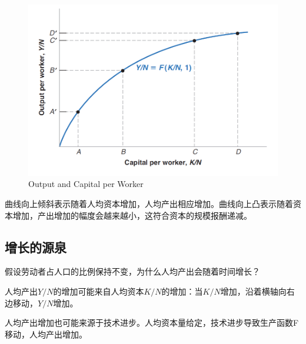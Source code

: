\documentclass{article}
\begin{document}
\begin{figure}[H] %
	\centering %
	\includegraphics[width=1\textwidth]{10_1} %
	\caption{Output and Capital per
		Worker} %
	\label{Fig.main2} %
\end{figure}

曲线向上倾斜表示随着人均资本增加，人均产出相应增加。曲线向上凸表示随着资本增加，产出增加的幅度会越来越小，这符合资本的规模报酬递减。

\subsection{增长的源泉}

假设劳动者占人口的比例保持不变，为什么人均产出会随着时间增长？

人均产出$ Y/N $的增加可能来自人均资本$ K/N $的增加：当$ K/N $增加，沿着横轴向右边移动，$ Y/N $增加。

人均产出增加也可能来源于技术进步。人均资本量给定，技术进步导致生产函数F移动，人均产出增加。
\end{document}
